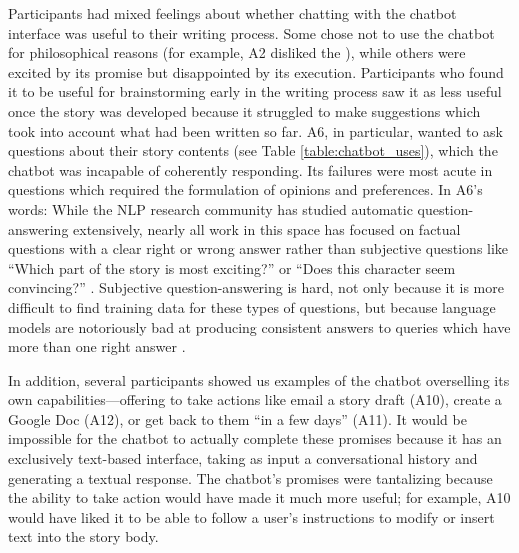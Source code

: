 Participants had mixed feelings about whether chatting with the chatbot interface was useful to their writing process.
Some chose not to use the chatbot for philosophical reasons (for example, A2 disliked the ), while others were excited by its promise but disappointed by its execution. 
Participants who found it to be useful for brainstorming early in the writing process saw it as less useful once the story was developed because it struggled to make suggestions which took into account what had been written so far. 
A6, in particular, wanted to ask questions about their story contents (see Table \ref{table:chatbot_uses}), which the chatbot was incapable of coherently responding.
Its failures were most acute in questions which required the formulation of opinions and preferences.
In A6's words: 
While the NLP research community has studied automatic question-answering extensively, nearly all work in this space has focused on factual questions with a clear right or wrong answer rather than subjective questions like ``Which part of the story is most exciting?'' or ``Does this character seem convincing?'' \citep{huang2020recent}. Subjective question-answering is hard, not only because it is more difficult to find training data for these types of questions, but because language models are notoriously bad at producing consistent answers to queries which have more than one right answer \citep{li2021addressing}.

In addition, several participants showed us examples of the chatbot overselling its own capabilities---offering to take actions like email a story draft (A10), create a Google Doc (A12), or get back to them ``in a few days'' (A11).
It would be impossible for the chatbot to actually complete these promises because it has an exclusively text-based interface, taking as input a conversational history and generating a textual response.
The chatbot's promises were tantalizing because the ability to take action would have made it much more useful; for example, A10 would have liked it to be able to follow a user's instructions to modify or insert text into the story body.

